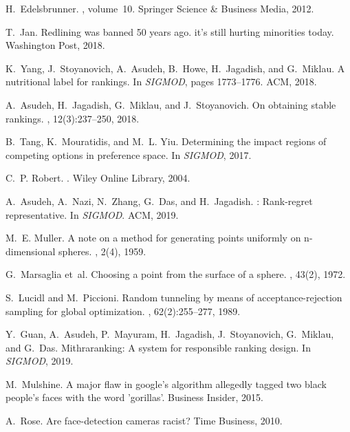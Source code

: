 \documentclass[11pt]{article}
\begin{document}
\begin{thebibliography}{10}
\begin{small}
H.~Edelsbrunner.
, volume~10.
\newblock Springer Science \& Business Media, 2012.

T.~Jan.
\newblock Redlining was banned 50 years ago. it’s still hurting minorities
  today.
\newblock Washington Post, 2018.

K.~Yang, J.~Stoyanovich, A.~Asudeh, B.~Howe, H.~Jagadish, and G.~Miklau.
\newblock A nutritional label for rankings.
\newblock In {\em SIGMOD}, pages 1773--1776. ACM, 2018.

A.~Asudeh, H.~Jagadish, G.~Miklau, and J.~Stoyanovich.
\newblock On obtaining stable rankings.
, 12(3):237--250, 2018.

B.~Tang, K.~Mouratidis, and M.~L. Yiu.
\newblock Determining the impact regions of competing options in preference
  space.
\newblock In {\em SIGMOD}, 2017.

C.~P. Robert.
.
\newblock Wiley Online Library, 2004.

A.~Asudeh, A.~Nazi, N.~Zhang, G.~Das, and H.~Jagadish.
: Rank-regret representative.
\newblock In {\em SIGMOD}. ACM, 2019.

M.~E. Muller.
\newblock A note on a method for generating points uniformly on n-dimensional
  spheres.
, 2(4), 1959.

G.~Marsaglia et~al.
\newblock Choosing a point from the surface of a sphere.
, 43(2), 1972.

S.~Lucidl and M.~Piccioni.
\newblock Random tunneling by means of acceptance-rejection sampling for global
  optimization.
,
  62(2):255--277, 1989.

Y.~Guan, A.~Asudeh, P.~Mayuram, H.~Jagadish, J.~Stoyanovich, G.~Miklau, and
  G.~Das.
\newblock Mithraranking: A system for responsible ranking design.
\newblock In {\em SIGMOD}, 2019.

M.~Mulshine.
\newblock A major flaw in google's algorithm allegedly tagged two black
  people's faces with the word 'gorillas'.
\newblock Business Insider, 2015.

A.~Rose.
\newblock Are face-detection cameras racist?
\newblock Time Business, 2010.


\end{small}
\end{thebibliography}
\end{document}
